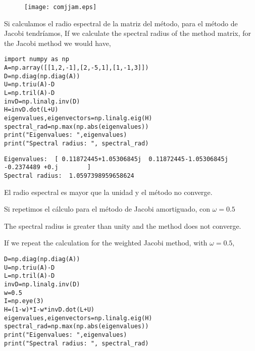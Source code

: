\begin{figure}[h]
\centering
\texttt{[image: comjjam.eps]}
\label{fig:cjjam}


\end{figure}

\begin{paracol}{2}
Si calculamos el radio espectral de la matriz del método, para el método de Jacobi tendríamos,
\switchcolumn
If we calculate the spectral radius of the method matrix, for the Jacobi method we would have,

\end{paracol}

\begin{verbatim}
import numpy as np
A=np.array([[1,2,-1],[2,-5,1],[1,-1,3]])
D=np.diag(np.diag(A))
U=np.triu(A)-D
L=np.tril(A)-D
invD=np.linalg.inv(D)
H=invD.dot(L+U)
eigenvalues,eigenvectors=np.linalg.eig(H)
spectral_rad=np.max(np.abs(eigenvalues))
print("Eigenvalues: ",eigenvalues)
print("Spectral radius: ", spectral_rad)
\end{verbatim}

\begin{verbatim}
Eigenvalues:  [ 0.11872445+1.05306845j  0.11872445-1.05306845j -0.2374489 +0.j        ]
Spectral radius:  1.0597398959658624
\end{verbatim}

\begin{paracol}{2}
El radio espectral es mayor que la unidad y el método no converge.

Si repetimos el cálculo para el método de Jacobi amortiguado, con $\omega=0.5$

\switchcolumn
The spectral radius is greater than unity and the method does not converge.

If we repeat the calculation for the weighted Jacobi method, with $\omega=0.5$,
\end{paracol}

\begin{verbatim}
D=np.diag(np.diag(A))
U=np.triu(A)-D
L=np.tril(A)-D
invD=np.linalg.inv(D)
w=0.5
I=np.eye(3)
H=(1-w)*I-w*invD.dot(L+U)
eigenvalues,eigenvectors=np.linalg.eig(H)
spectral_rad=np.max(np.abs(eigenvalues))
print("Eigenvalues: ",eigenvalues)
print("Spectral radius: ", spectral_rad)

\end{verbatim}

